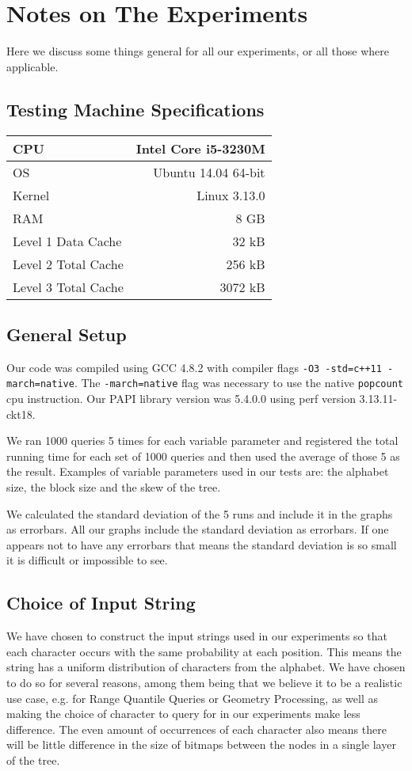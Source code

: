 \section{Notes on The Experiments}
Here we discuss some things general for all our experiments, or all those where applicable.

\subsection{Testing Machine Specifications}
\begin{tabular}{|lr|}
\hline
CPU				&	Intel Core i5-3230M \\ \hline
OS				&	Ubuntu 14.04 64-bit \\ \hline
Kernel			&	Linux 3.13.0 \\ \hline
RAM				&	8 GB 	\\ \hline
Level 1 Data Cache	&	32 kB \\ \hline
Level 2 Total Cache	&	256 kB \\ \hline
Level 3 Total Cache	&	3072 kB \\ \hline
\end{tabular}

\subsection{General Setup}
\label{sec:ExpNotesGeneralSetup}
Our code was compiled using GCC 4.8.2 with compiler flags \texttt{-O3 -std=c++11 -march=native}.
The \texttt{-march=native} flag was necessary to use the native \texttt{popcount} cpu instruction.
Our PAPI library version was 5.4.0.0 using perf version 3.13.11-ckt18.

We ran 1000 queries 5 times for each variable parameter and registered the total running time for each set of 1000 queries and then used the average of those 5 as the result.
Examples of variable parameters used in our tests are: the alphabet size, the block size and the skew of the tree.

We calculated the standard deviation of the 5 runs and include it in the graphs as errorbars.
All our graphs include the standard deviation as errorbars.
If one appears not to have any errorbars that means the standard deviation is so small it is difficult or impossible to see.

\subsection{Choice of Input String}
\label{sec:choiceOfInputString}
We have chosen to construct the input strings used in our experiments so that each character occurs with the same probability at each position.
This means the string has a uniform distribution of characters from the alphabet.
We have chosen to do so for several reasons, among them being that we believe it to be a realistic use case, e.g. for Range Quantile Queries or Geometry Processing, as well as making the choice of character to query for in our experiments make less difference.
The even amount of occurrences of each character also means there will be little difference in the size of bitmaps between the nodes in a single layer of the tree.

